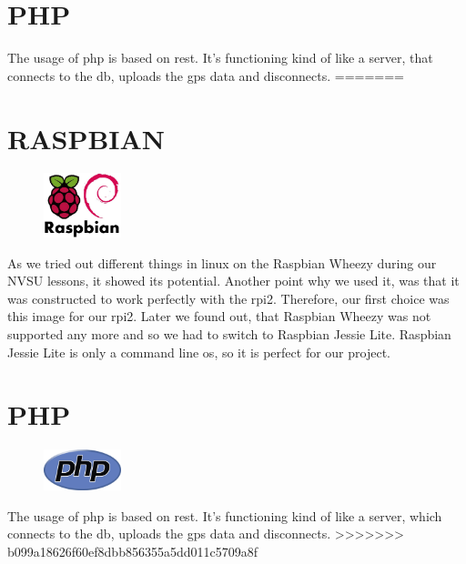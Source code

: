 \section{PHP}
The usage of \gls{php} is based on \gls{rest}. It's functioning kind of like a server, that connects to the \gls{db}, uploads the \gls{gps} data and disconnects.
=======
\section{RASPBIAN}
\begin{figure}
  \begin{center}
    \includegraphics[width=0.2\textwidth] {bilder/raspbian}
  \end{center}
\end{figure}
As we tried out different things in linux on the Raspbian Wheezy during our NVSU lessons, it showed its potential. Another point why we used it, was that it was constructed to work perfectly with the \gls{rpi2}. Therefore, our first choice was this image for our \gls{rpi2}. Later we found out, that Raspbian Wheezy was not supported any more and so we had to switch to Raspbian Jessie Lite. Raspbian Jessie Lite is only a command line \gls{os}, so it is perfect for our project.
\section{PHP}
\begin{figure}
  \begin{center}
    \includegraphics[width=0.2\textwidth] {bilder/php}
  \end{center}
\end{figure}
The usage of \gls{php} is based on \gls{rest}. It's functioning kind of like a server, which connects to the \gls{db}, uploads the \gls{gps} data and disconnects.
>>>>>>> b099a18626f60ef8dbb856355a5dd011c5709a8f
